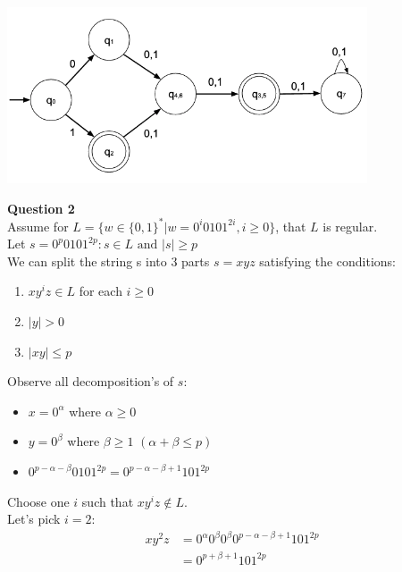 \documentclass{article}
\begin{document}
\begin{center}
    \includegraphics[width=0.8\textwidth]{1.png}
\end{center}

\break
{\bf Question 2}\\
Assume for $L = \{w \in \{0,1\}^* | w = 0^i0101^{2i}, i \geq 0 \}$, that $L$ is regular.\\
Let $s = 0^p0101^{2p}: s \in L \text{ and } |s| \geq p$\\
We can split the string s into 3 parts $s = xyz$ satisfying the conditions:

\begin{enumerate}
  \item $xy^iz \in L$ for each $i \geq 0$
  \item $|y| > 0$
  \item $|xy| \leq p$
\end{enumerate}

Observe all decomposition's of $s$:

\begin{itemize}
  \item $x = 0^\alpha$ where $\alpha \geq 0$
  \item $y =  0^\beta$ where $\beta \geq 1$ $(\alpha + \beta \leq p)$
  \item $0^{p - \alpha - \beta}0101^{2p}=0^{p-\alpha - \beta+1}101^{2p}$
\end{itemize}

Choose one $i$ such that $xy^iz \notin L$.\\ 
Let's pick $i = 2$:\\
\begin{equation*} 
\begin{split}
   xy^2z &= 0^\alpha 0^\beta 0^\beta 0^{p-\alpha - \beta + 1}101^{2p}\\
   &= 0^{p + \beta + 1}101^{2p}\\
\end{split}
\end{equation*}
\end{document}
